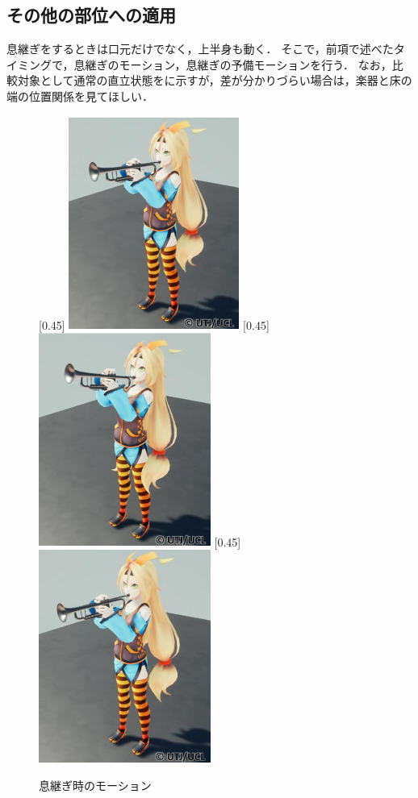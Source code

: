 \subsection{その他の部位への適用}
\indent
息継ぎをするときは口元だけでなく，上半身も動く．
そこで，前項で述べたタイミングで，息継ぎのモーション，息継ぎの予備モーションを行う．
なお，比較対象として通常の直立状態をに示すが，差が分かりづらい場合は，楽器と床の端の位置関係を見てほしい．\\
\begin{figure}[t]
	\centering
	[0.45\linewidth]{
		\includegraphics[height=7cm]{fig/chap3/default.eps}}
	[0.45\linewidth]{
		\includegraphics[height=7cm]{fig/chap3/up.eps}}
	[0.45\linewidth]{
		\includegraphics[height=7cm]{fig/chap3/down.eps}}
	\caption{息継ぎ時のモーション}
	\label{fig:breath}
\end{figure}
